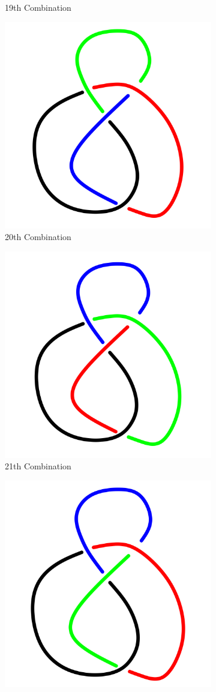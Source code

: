 \documentclass[a4paper,9pt]{article}
\begin{document}
\begin{enumerate}
\begin{figure}[h!]
\begin{subfigure}[b]{0.25\linewidth}
	\caption{19th Combination}
\end{subfigure}
\qquad
\begin{subfigure}[b]{0.25\linewidth}
	\centering
	\includegraphics[width=0.5\linewidth]{picture/knotpict/knot-20}
	\caption{20th Combination}
\end{subfigure}
\qquad
\begin{subfigure}[b]{0.25\linewidth}
	\centering
	\includegraphics[width=0.5\linewidth]{picture/knotpict/knot-21}
	\caption{21th Combination}
\end{subfigure}
\qquad
\begin{subfigure}[b]{0.25\linewidth}
	\centering
	\includegraphics[width=0.5\linewidth]{picture/knotpict/knot-22}

\end{subfigure}
\end{figure}
\end{enumerate}
\end{document}
